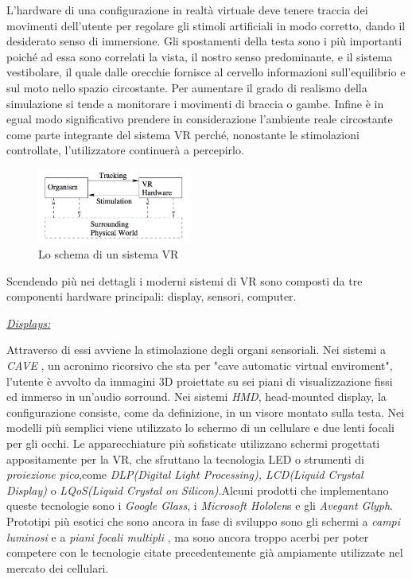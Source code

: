 L'hardware di una configurazione in realtà virtuale deve tenere traccia dei movimenti dell'utente per regolare gli stimoli artificiali in modo corretto, dando il desiderato senso di immersione.
Gli spostamenti della testa sono i più importanti poiché ad essa sono correlati la vista, il nostro senso predominante, e il sistema vestibolare, il quale dalle orecchie fornisce al cervello informazioni sull'equilibrio e sul moto nello spazio circostante.\cite{vestibular} \newpage Per aumentare il grado di realismo della simulazione si tende a monitorare i movimenti di braccia o gambe. Infine è in egual modo significativo prendere in considerazione l'ambiente reale circostante come parte integrante del sistema VR perché, nonostante  le stimolazioni controllate, l'utilizzatore  continuerà a percepirlo.
\begin{figure}[H]
	\includegraphics[width=0.45\textwidth]{figure/TrackingStimuliBB}
	\centering
	\caption{Lo schema di un sistema VR}
\end{figure}
Scendendo più nei dettagli i moderni sistemi di VR sono composti da tre componenti hardware principali: display, sensori, computer.\newline

\begin{flushleft}
	\underline{\textit{Displays:}}
\end{flushleft}  Attraverso di essi avviene la stimolazione degli organi sensoriali. Nei sistemi a \textit{CAVE} , un acronimo ricorsivo che sta per "cave automatic virtual enviroment", l'utente è avvolto da immagini 3D proiettate su sei piani di visualizzazione fissi ed immerso in un'audio sorround. Nei sistemi \textit{HMD}, head-mounted display, la configurazione consiste, come da definizione, in un visore montato sulla testa. Nei modelli più semplici viene utilizzato lo schermo di un cellulare e due lenti focali per gli occhi. Le apparecchiature più sofisticate utilizzano schermi progettati appositamente per la VR, che sfruttano la tecnologia LED 
o strumenti di \textit{proiezione pico},come \textit{DLP(Digital Light Processing), LCD(Liquid Crystal Display)} o \textit{LQoS(Liquid Crystal on Silicon)}.Alcuni prodotti che implementano queste tecnologie sono i\textit{ Google Glass}, i \textit{Microsoft Hololen}s e gli \textit{Avegant Glyph}. Prototipi più esotici che sono ancora in fase di sviluppo sono gli schermi a \textit{campi luminosi} \cite{LFD} e a \textit{piani focali multipli} \cite{MFP}, ma sono ancora troppo acerbi per poter competere con le tecnologie citate precedentemente già ampiamente utilizzate nel mercato dei cellulari. \newpage

